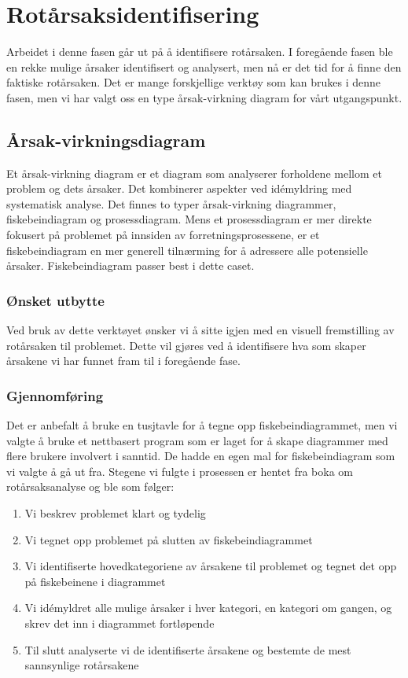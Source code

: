 \chapter{Rotårsaksidentifisering}
Arbeidet i denne fasen går ut på å identifisere rotårsaken. I foregående fasen ble en rekke mulige årsaker identifisert og analysert, men nå er det tid for å finne den faktiske rotårsaken. Det er mange forskjellige verktøy som kan brukes i denne fasen, men vi har valgt oss en type årsak-virkning diagram for vårt utgangspunkt.

\section{Årsak-virkningsdiagram}
Et årsak-virkning diagram er et diagram som analyserer forholdene mellom et problem og dets årsaker. Det kombinerer aspekter ved idémyldring med systematisk analyse. Det finnes to typer årsak-virkning diagrammer, fiskebeindiagram og prosessdiagram. Mens et prosessdiagram er mer direkte fokusert på problemet på innsiden av forretningsprosessene, er et fiskebeindiagram en mer generell tilnærming for å adressere alle potensielle årsaker\cite{RCA}. Fiskebeindiagram passer best i dette caset.

\subsection{Ønsket utbytte}
Ved bruk av dette verktøyet ønsker vi å sitte igjen med en visuell fremstilling av rotårsaken til problemet. Dette vil gjøres ved å identifisere hva som skaper årsakene vi har funnet fram til i foregående fase.

\subsection{Gjennomføring}
Det er anbefalt å bruke en tusjtavle for å tegne opp fiskebeindiagrammet, men vi valgte å bruke et nettbasert program som er laget for å skape diagrammer med flere brukere involvert i sanntid. De hadde en egen mal for fiskebeindiagram som vi valgte å gå ut fra. Stegene vi fulgte i prosessen er hentet fra boka om rotårsaksanalyse \cite{RCA} og ble som følger:
\begin{enumerate}
    \item Vi beskrev problemet klart og tydelig
    \item Vi tegnet opp problemet på slutten av fiskebeindiagrammet
    \item Vi identifiserte hovedkategoriene av årsakene til problemet og tegnet det opp på fiskebeinene i diagrammet
    \item Vi idémyldret alle mulige årsaker i hver kategori, en kategori om gangen, og skrev det inn i diagrammet fortløpende
    \item Til slutt analyserte vi de identifiserte årsakene og bestemte de mest sannsynlige rotårsakene
\end{enumerate}

